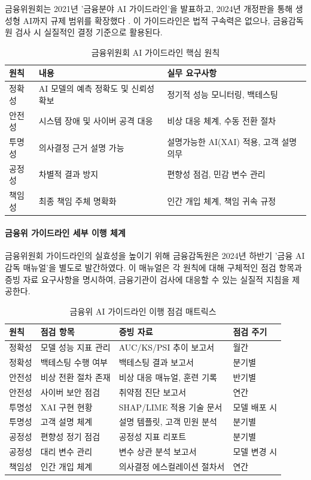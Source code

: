 금융위원회는 2021년 '금융분야 AI 가이드라인'을 발표하고, 2024년 개정판을 통해 생성형 AI까지 규제 범위를 확장했다 \cite{fsc2024ai}. 이 가이드라인은 법적 구속력은 없으나, 금융감독원 검사 시 실질적인 결정 기준으로 활용된다.

\begin{table}[htbp]
\centering
\caption{금융위원회 AI 가이드라인 핵심 원칙}
\label{tab:17_1}
\begin{tabularx}{\textwidth}{p{2cm}Xp{5cm}}
\toprule
\textbf{원칙} & \textbf{내용} & \textbf{실무 요구사항} \\
\midrule
정확성 & AI 모델의 예측 정확도 및 신뢰성 확보 & 정기적 성능 모니터링, 백테스팅\cite{klaise2021monitoring} \\
안전성 & 시스템 장애 및 사이버 공격 대응 & 비상 대응 체계, 수동 전환 절차 \\
투명성 & 의사결정 근거 설명 가능 & 설명가능한 AI(XAI) 적용, 고객 설명 의무 \\
공정성 & 차별적 결과 방지 & 편향\cite{fuster2022predictably}성 점검, 민감 변수 관리 \\
책임성 & 최종 책임 주체 명확화 & 인간 개입 체계, 책임 귀속 규정 \\
\bottomrule
\end{tabularx}
\end{table}

\paragraph{금융위 가이드라인 세부 이행 체계}

금융위원회 가이드라인의 실효성을 높이기 위해 금융감독원은 2024년 하반기 '금융 AI 감독 매뉴얼'을 별도로 발간하였다. 이 매뉴얼은 각 원칙에 대해 구체적인 점검 항목과 증빙 자료 요구사항을 명시하여, 금융기관이 검사에 대응할 수 있는 실질적 지침을 제공한다.

\begin{table}[htbp]
\centering
\caption{금융위 AI 가이드라인 이행 점검 매트릭스}
\label{tab:17_1b}
\begin{tabularx}{\textwidth}{p{1.8cm}p{3cm}Xp{3cm}}
\toprule
\textbf{원칙} & \textbf{점검 항목} & \textbf{증빙 자료} & \textbf{점검 주기} \\
\midrule
정확성 & 모델 성능 지표 관리 & AUC/KS/PSI 추이 보고서 & 월간 \\
정확성 & 백테스팅 수행 여부 & 백테스팅 결과 보고서 & 분기별 \\
안전성 & 비상 전환 절차 존재 & 비상 대응 매뉴얼, 훈련 기록 & 반기별 \\
안전성 & 사이버 보안 점검 & 취약점 진단 보고서 & 연간 \\
투명성 & XAI 구현 현황 & SHAP/LIME 적용 기술 문서 & 모델 배포 시 \\
투명성 & 고객 설명 체계 & 설명 템플릿, 고객 민원 분석 & 분기별 \\
공정성 & 편향성 정기 점검 & 공정성 지표 리포트 & 분기별 \\
공정성 & 대리 변수 관리 & 변수 상관 분석 보고서 & 모델 변경 시 \\
책임성 & 인간 개입 체계 & 의사결정 에스컬레이션 절차서 & 연간 \\
\bottomrule
\end{tabularx}
\end{table}

